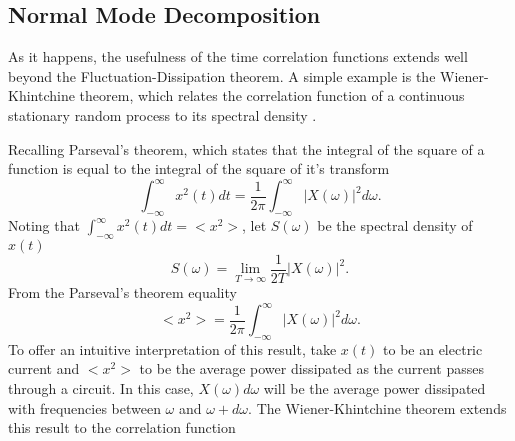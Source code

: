 \subsection{Normal Mode Decomposition}
As it happens, the usefulness of the time correlation functions extends well beyond the Fluctuation-Dissipation theorem. A simple example is the Wiener-Khintchine theorem, which relates the correlation function of a continuous stationary random process to its spectral density \cite{mcquarrie2000statistical}.
\begin{comment}
The correlation function of a time-dependent quantity (i.e: position, velocity, etc.) is defined as the average behaviour in time of said quantity \cite{mcquarrie2000statistical}
%
\begin{equation}
C(t)=\lim_{T->\infty}\frac{1}{2T}\int_{-T}^{T}x(t+t')x(t')dt'
\end{equation}
%
From the ergodic hypothesis, as used in the Section ~\ref{}%
\begin{equation}
C(t)=<x(t+t')x(t')>.
\end{equation}
%
Let's define $X(\omega)$ as the Fourier Transform of $x(t)$
%
\begin{equation}
X(\omega)=\int_{-\infty}^{\infty}x(t)\exp{-i\omega t}dt.
\end{equation}
%
\end{comment}
Recalling Parseval's theorem, which states that the integral of the square of a function is equal to the integral of the square of it's transform
%
\begin{equation}
\int_{-\infty}^{\infty}x^2(t)dt=\frac{1}{2\pi}\int_{-\infty}^{\infty}|X(\omega)|^2d\omega.
\end{equation}
%
Noting that $\int_{-\infty}^{\infty}x^2(t)dt=<x^2>$, let $S(\omega)$ be the spectral density of $x(t)$
%
\begin{equation}
S(\omega)=\lim_{T\rightarrow\infty}\frac{1}{2T}|X(\omega)|^2.
\end{equation}
%
From the Parseval's theorem equality
%
\begin{equation}
<x^2>=\frac{1}{2\pi}\int_{-\infty}^{\infty}|X(\omega)|^2d\omega.
\end{equation}
%
To offer an intuitive interpretation of this result, take $x(t)$ to be an electric current and $<x^2>$ to be the average power dissipated as the current passes through a circuit. In this case, $X(\omega)d\omega$ will be the average power dissipated with frequencies between $\omega$ and $\omega+d\omega$. The Wiener-Khintchine theorem extends this result to the correlation function
